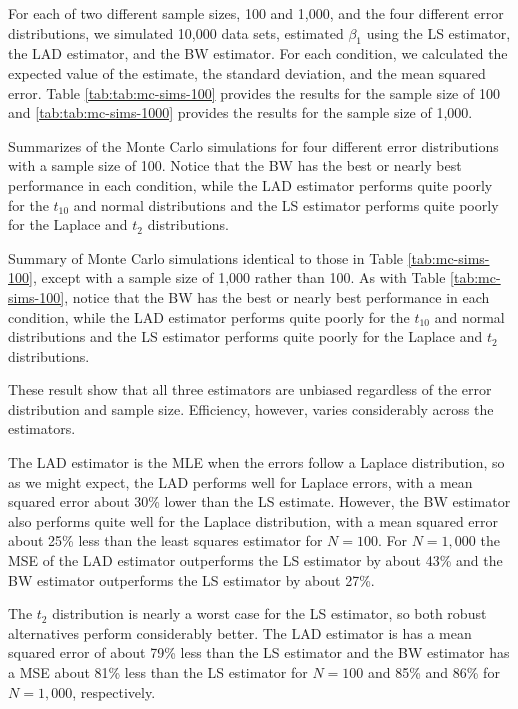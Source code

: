 \documentclass[12pt]{article}
\begin{document}
For each of two different sample sizes, 100 and 1,000, and the four different error distributions, we simulated 10,000 data sets, estimated $\beta_1$ using the LS estimator, the LAD estimator, and the BW estimator. For each condition, we calculated the expected value of the estimate, the standard deviation, and the mean squared error. Table \ref{tab:tab:mc-sims-100} provides the results for the sample size of 100 and \ref{tab:tab:mc-sims-1000} provides the results for the sample size of 1,000. 

\begin{table}
{\tiny

}
\caption{Summarizes of the Monte Carlo simulations for four different error distributions with a sample size of 100. Notice that the BW has the best or nearly best performance in each condition, while the LAD estimator performs quite poorly for the $t_{10}$ and normal distributions and the LS estimator performs quite poorly for the Laplace and $t_2$ distributions.}\label{tab:mc-sims-100}
\end{table}

\begin{table}
{\tiny

}
\caption{Summary of Monte Carlo simulations identical to those in Table \ref{tab:mc-sims-100}, except with a sample size of 1,000 rather than 100. As with Table \ref{tab:mc-sims-100}, notice that the BW has the best or nearly best performance in each condition, while the LAD estimator performs quite poorly for the $t_{10}$ and normal distributions and the LS estimator performs quite poorly for the Laplace and $t_2$ distributions.}\label{tab:mc-sims-1000}
\end{table}

These result show that all three estimators are unbiased regardless of the error distribution and sample size. Efficiency, however, varies considerably across the estimators.

The LAD estimator is the MLE when the errors follow a Laplace distribution, so as we might expect, the LAD performs well for Laplace errors, with a mean squared error about 30\% lower than the LS estimate. However, the BW estimator also performs quite well for the Laplace distribution, with a mean squared error about 25\% less than the least squares estimator for $N = 100$. For $N = 1,000$ the MSE of the LAD estimator outperforms the LS estimator by about 43\% and the BW estimator outperforms the LS estimator by about 27\%.

The $t_2$ distribution is nearly a worst case for the LS estimator, so both robust alternatives perform considerably better. The LAD estimator is has a mean squared error of about 79\% less than the LS estimator and the BW estimator has a MSE about 81\% less than the LS estimator for $N = 100$ and 85\% and 86\% for $N = 1,000$, respectively. 
\end{document}
